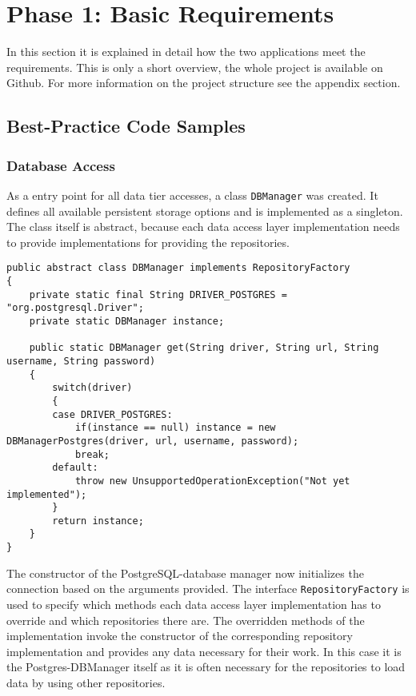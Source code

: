 \clearpage
\section{Phase 1: Basic Requirements}
\label{sec:code-samples}
In this section it is explained in detail how the two applications meet the requirements. This is only a short overview, the whole project is available on Github. For more information on the project structure see the appendix section.

\subsection{Best-Practice Code Samples}

\subsubsection{Database Access}
As a entry point for all data tier accesses, a class \texttt{DBManager} was created. It defines all available persistent storage options and is implemented as a singleton. The class itself is abstract, because each data access layer implementation needs to provide implementations for providing the repositories.
\begin{lstlisting}[caption={DBManager singleton class. Used for instantiating the implementation of the chosen interface.}, captionpos=b, label={lst:dbmanager}]
public abstract class DBManager implements RepositoryFactory
{
	private static final String DRIVER_POSTGRES = "org.postgresql.Driver";
	private static DBManager instance;
	
	public static DBManager get(String driver, String url, String username, String password)
	{
		switch(driver)
		{
		case DRIVER_POSTGRES:
			if(instance == null) instance = new DBManagerPostgres(driver, url, username, password);
			break;
		default:
			throw new UnsupportedOperationException("Not yet implemented");
		}
		return instance;
	}
}
\end{lstlisting}

The constructor of the PostgreSQL-database manager now initializes the connection based on the arguments provided. The interface \texttt{RepositoryFactory} is used to specify which methods each data access layer implementation has to override and which repositories there are. The overridden methods of the implementation invoke the constructor of the corresponding repository implementation and provides any data necessary for their work. In this case it is the Postgres-DBManager itself as it is often necessary for the repositories to load data by using other repositories.

